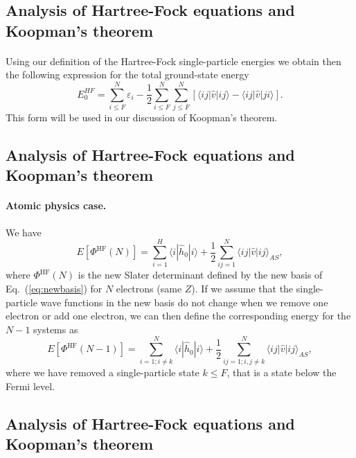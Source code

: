 \documentclass[%
twoside,                 %
final,                   %
10pt]{article}
\begin{document}
\subsection{Analysis of Hartree-Fock equations and Koopman's theorem}

\paragraph{}
Using our definition of the Hartree-Fock single-particle energies we obtain then the following expression for the total ground-state energy
\[
  E_0^{HF}
  = \sum_{i\le F}^N \varepsilon_i - \frac{1}{2}\sum_{i\le F}^N\sum_{j \le F}^N\left[\langle ij |\hat{v}|ij \rangle-\langle ij|\hat{v}|ji\rangle\right].
\]
This form will be used in our discussion of Koopman's theorem.



\subsection{Analysis of Hartree-Fock equations and Koopman's theorem}

\paragraph{Atomic physics case.}
We have 
\[
  E[\Phi^{\mathrm{HF}}(N)] 
  = \sum_{i=1}^H \langle i | \hat{h}_0 | i \rangle +
  \frac{1}{2}\sum_{ij=1}^N\langle ij|\hat{v}|ij\rangle_{AS},
\]
where $\Phi^{\mathrm{HF}}(N)$ is the new Slater determinant defined by the new basis of Eq.~(\ref{eq:newbasis})
for $N$ electrons (same $Z$).  If we assume that the single-particle wave functions in the new basis do not change 
when we remove one electron or add one electron, we can then define the corresponding energy for the $N-1$ systems as 
\[
  E[\Phi^{\mathrm{HF}}(N-1)] 
  = \sum_{i=1; i\ne k}^N \langle i | \hat{h}_0 | i \rangle +
  \frac{1}{2}\sum_{ij=1;i,j\ne k}^N\langle ij|\hat{v}|ij\rangle_{AS},
\]
where we have removed a single-particle state $k\le F$, that is a state below the Fermi level.



\subsection{Analysis of Hartree-Fock equations and Koopman's theorem}
\end{document}
